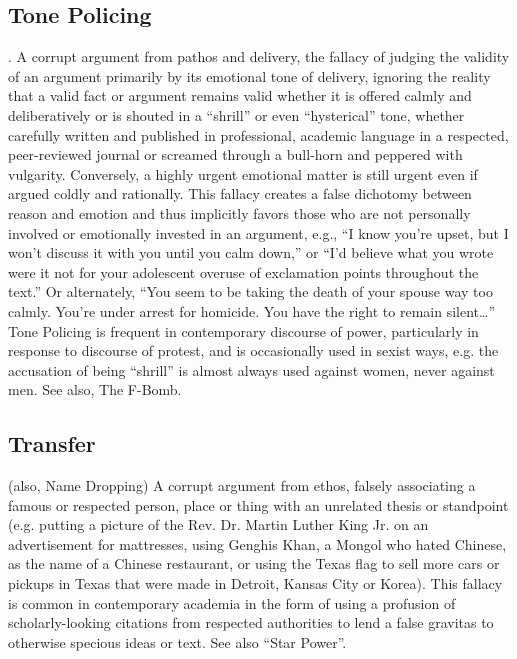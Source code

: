 \documentclass[10pt,a4paper,british]{article}
\begin{document}
\begin{multicols}{2}
	\subsection{Tone Policing}. A corrupt argument from pathos and delivery, the fallacy of judging the validity of an argument primarily by its emotional tone of delivery, ignoring the reality that a valid fact or argument remains valid whether it is offered calmly and deliberatively or is shouted in a ``shrill'' or even ``hysterical'' tone, whether carefully written and published in professional, academic language in a respected, peer{-}reviewed journal or screamed through a bull{-}horn and peppered with vulgarity. Conversely, a highly urgent emotional matter is still urgent even if argued coldly and rationally.  This fallacy creates a false dichotomy between reason and emotion and thus implicitly favors those who are not personally involved or emotionally invested in an argument, e.g., ``I know you're upset, but I won't discuss it with you until you calm down,'' or ``I'd believe what you wrote were it not for your adolescent overuse of exclamation points throughout the text.'' Or alternately, ``You seem to be taking the death of your spouse way too calmly. You're under arrest for homicide. You have the right to remain silent\ldots'' Tone Policing is frequent in contemporary discourse of power, particularly in response to discourse of protest, and is occasionally used in sexist ways, e.g. the accusation of being ``shrill'' is almost always used against women, never against men. See also, The F{-}Bomb.  

    \subsection{Transfer} (also, Name Dropping) A corrupt argument from ethos, falsely associating a famous or respected person, place or thing with an unrelated thesis or standpoint (e.g. putting a picture of the Rev. Dr.  Martin Luther King Jr. on an advertisement for mattresses, using Genghis Khan, a Mongol who hated Chinese, as the name of a Chinese restaurant, or using the Texas flag to sell more cars or pickups in Texas that were made in Detroit, Kansas City or Korea). This fallacy is common in contemporary academia in the form of using a profusion of scholarly{-}looking citations from respected authorities to lend a false gravitas to otherwise specious ideas or text. See also ``Star Power''.  


\end{multicols}
\end{document}
